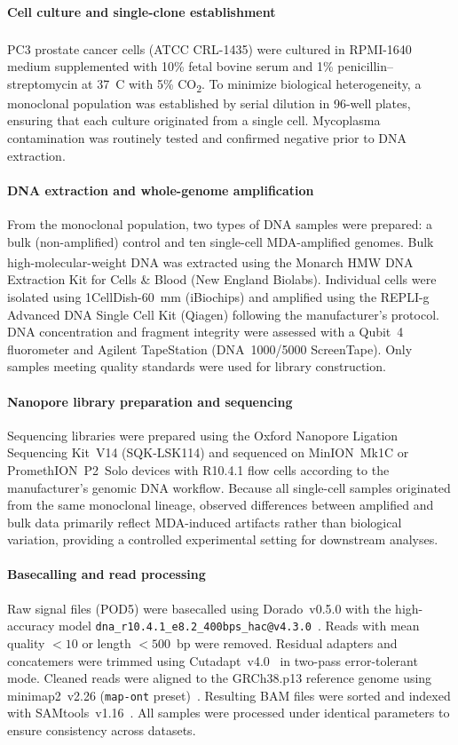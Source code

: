 \documentclass[pdflatex,sn-nature]{sn-jnl}%
\theoremstyle{thmstyleone}%
\theoremstyle{thmstyletwo}%
\theoremstyle{thmstylethree}%
\begin{document}
\paragraph{Cell culture and single-clone establishment}
PC3 prostate cancer cells (ATCC\textsuperscript{\textregistered} CRL-1435\texttrademark) were cultured in RPMI-1640 medium supplemented with 10\% fetal bovine serum and 1\% penicillin--streptomycin at 37~\textdegree C with 5\% CO\textsubscript{2}. To minimize biological heterogeneity, a monoclonal population was established by serial dilution in 96-well plates, ensuring that each culture originated from a single cell. Mycoplasma contamination was routinely tested and confirmed negative prior to DNA extraction.

\paragraph{DNA extraction and whole-genome amplification}
From the monoclonal population, two types of DNA samples were prepared: a bulk (non-amplified) control and ten single-cell MDA-amplified genomes. Bulk high-molecular-weight DNA was extracted using the Monarch\textsuperscript{\textregistered} HMW DNA Extraction Kit for Cells \& Blood (New England Biolabs). Individual cells were isolated using 1CellDish-60~mm (iBiochips) and amplified using the REPLI-g Advanced DNA Single Cell Kit (Qiagen) following the manufacturer's protocol. DNA concentration and fragment integrity were assessed with a Qubit~4 fluorometer and Agilent TapeStation (DNA~1000/5000 ScreenTape). Only samples meeting quality standards were used for library construction.

\paragraph{Nanopore library preparation and sequencing}
Sequencing libraries were prepared using the Oxford Nanopore Ligation Sequencing Kit~V14 (SQK-LSK114) and sequenced on MinION~Mk1C or PromethION~P2~Solo devices with R10.4.1 flow cells according to the manufacturer's genomic DNA workflow. Because all single-cell samples originated from the same monoclonal lineage, observed differences between amplified and bulk data primarily reflect MDA-induced artifacts rather than biological variation, providing a controlled experimental setting for downstream analyses.

\paragraph{Basecalling and read processing}
Raw signal files (POD5) were basecalled using Dorado~v0.5.0 with the high-accuracy model \texttt{dna\_r10.4.1\_e8.2\_400bps\_hac@v4.3.0}~\cite{dorado2023}. Reads with mean quality $< 10$ or length $< 500$~bp were removed. Residual adapters and concatemers were trimmed using Cutadapt~v4.0~\cite{martin2011cutadapt} in two-pass error-tolerant mode. Cleaned reads were aligned to the GRCh38.p13 reference genome using minimap2~v2.26 (\texttt{map-ont} preset)~\cite{li2018minimap2}. Resulting BAM files were sorted and indexed with SAMtools~v1.16~\cite{danecek2021twelve}. All samples were processed under identical parameters to ensure consistency across datasets.
\end{document}
